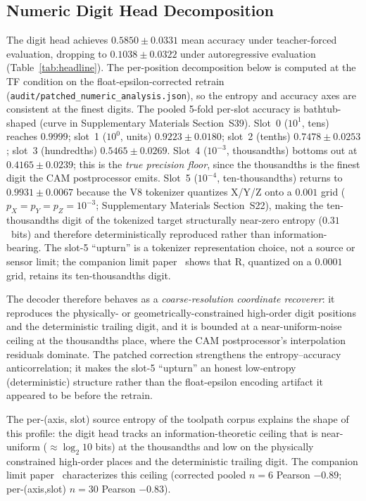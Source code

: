 \documentclass[sensors,article,submit,moreauthors,pdftex]{Definitions/mdpi}
\begin{document}
\subsection{Numeric Digit Head Decomposition}
\label{sec:numeric-decomposition}

The digit head achieves $0.5850 \pm 0.0331$ mean accuracy under teacher-forced evaluation, dropping to $0.1038 \pm 0.0322$ under autoregressive evaluation (Table~\ref{tab:headline}). The per-position decomposition below is computed at the TF condition on the float-epsilon-corrected retrain (\texttt{audit/patched\_numeric\_analysis.json}), so the entropy and accuracy axes are consistent at the finest digits. The pooled 5-fold per-slot accuracy is bathtub-shaped (curve in Supplementary Materials Section~S39). Slot~0 ($10^{1}$, tens) reaches $0.9999$; slot~1 ($10^{0}$, units) $0.9223 \pm 0.0180$; slot~2 (tenths) $0.7478 \pm 0.0253$; slot~3 (hundredths) $0.5465 \pm 0.0269$. Slot~4 ($10^{-3}$, thousandths) bottoms out at $0.4165 \pm 0.0239$; this is the \emph{true precision floor}, since the thousandths is the finest digit the CAM postprocessor emits. Slot~5 ($10^{-4}$, ten-thousandths) returns to $0.9931 \pm 0.0067$ because the V8 tokenizer quantizes X/Y/Z onto a $0.001$ grid ($p_X\!=\!p_Y\!=\!p_Z\!=\!10^{-3}$; Supplementary Materials Section~S22), making the ten-thousandths digit of the tokenized target structurally near-zero entropy ($0.31$~bits) and therefore deterministically reproduced rather than information-bearing. The slot-5 ``upturn'' is a tokenizer representation choice, not a source or sensor limit; the companion limit paper~\cite{paperB_entropy} shows that R, quantized on a $0.0001$ grid, retains its ten-thousandths digit.

The decoder therefore behaves as a \emph{coarse-resolution coordinate recoverer}: it reproduces the physically- or geometrically-constrained high-order digit positions and the deterministic trailing digit, and it is bounded at a near-uniform-noise ceiling at the thousandths place, where the CAM postprocessor's interpolation residuals dominate. The patched correction strengthens the entropy--accuracy anticorrelation; it makes the slot-5 ``upturn'' an honest low-entropy (deterministic) structure rather than the float-epsilon encoding artifact it appeared to be before the retrain.

The per-(axis, slot) source entropy of the toolpath corpus explains the shape of this profile: the digit head tracks an information-theoretic ceiling that is near-uniform ($\approx\!\log_2 10$ bits) at the thousandths and low on the physically constrained high-order places and the deterministic trailing digit. The companion limit paper~\cite{paperB_entropy} characterizes this ceiling (corrected pooled $n\!=\!6$ Pearson $-0.89$; per-(axis,slot) $n\!=\!30$ Pearson $-0.83$).
\end{document}
